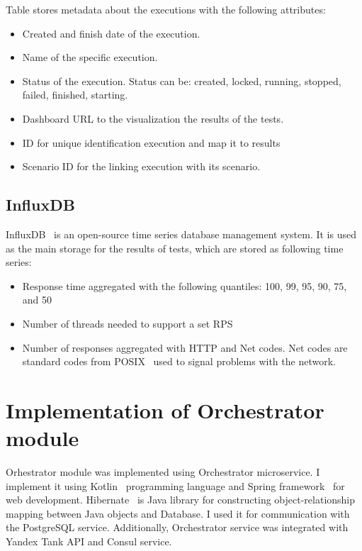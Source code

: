 Table  stores metadata about the executions with the following attributes:
\begin{itemize}
    \item Created and finish date of the execution.
    \item Name of the specific execution.
    \item Status of the execution. Status can be: created, locked, running,  stopped,  failed, finished, starting.
    \item Dashboard URL to the visualization the results of the tests.
    \item ID for unique identification execution and map it to results
    \item Scenario ID for the linking execution with its scenario.
\end{itemize}

\subsection{InfluxDB}\label{subsec:influxdb}
InfluxDB~\cite{influxdb} is an open-source time series database management system. It is used as the main storage for the results of tests, which are stored as following time series:
\begin{itemize}
    \item Response time aggregated with the following quantiles: 100, 99, 95, 90, 75, and 50
    \item Number of threads needed to support a set RPS
    \item Number of responses aggregated with HTTP and Net codes. Net codes are standard codes from POSIX~\cite{posix_errors} used to signal problems with the network.
\end{itemize}


\section{Implementation of Orchestrator module}\label{sec:ochestrator_impl}
Orhestrator module was implemented using Orchestrator microservice. I implement it using Kotlin~\cite{kotlin} programming language and Spring framework~\cite{spring} for web development. Hibernate~\cite{hibernate} is Java library for constructing object-relationship mapping between Java objects and Database. I used it for communication with the PostgreSQL service. Additionally, Orchestrator service was integrated with Yandex Tank API and Consul service.

